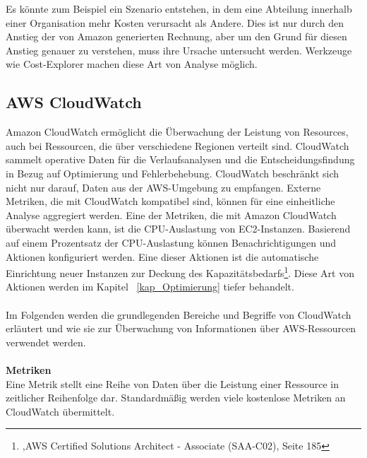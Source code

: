 Es könnte zum Beispiel ein Szenario entstehen, in dem eine Abteilung innerhalb einer Organisation mehr Kosten verursacht als Andere. Dies ist nur durch den Anstieg der von Amazon generierten Rechnung, aber um den Grund für diesen Anstieg genauer zu verstehen, muss ihre Ursache untersucht werden. Werkzeuge wie Cost-Explorer machen diese Art von Analyse möglich.


\subsection{AWS CloudWatch}
Amazon CloudWatch ermöglicht die Überwachung der Leistung von Resources, auch bei Ressourcen, die über verschiedene Regionen verteilt sind. CloudWatch sammelt operative Daten für die Verlaufsanalysen und die Entscheidungsfindung in Bezug auf Optimierung und Fehlerbehebung. CloudWatch beschränkt sich nicht nur darauf, Daten aus der AWS-Umgebung zu empfangen. Externe Metriken, die mit CloudWatch kompatibel sind, können für eine einheitliche Analyse aggregiert werden. Eine der Metriken, die mit Amazon CloudWatch überwacht werden kann, ist die CPU-Auslastung von EC2-Instanzen. Basierend auf einem Prozentsatz der CPU-Auslastung können Benachrichtigungen und Aktionen konfiguriert werden. Eine dieser Aktionen ist die automatische Einrichtung neuer Instanzen zur Deckung des Kapazitätsbedarfs\footnote{\cite{AWS1},AWS Certified Solutions Architect - Associate (SAA-C02), Seite 185}. Diese Art von Aktionen werden im Kapitel ~\ref{kap_Optimierung} tiefer behandelt.
\\\\
Im Folgenden werden die grundlegenden Bereiche und Begriffe von CloudWatch erläutert und wie sie zur Überwachung von Informationen über AWS-Ressourcen verwendet werden.
\\\\
\textbf{Metriken} \\
Eine Metrik stellt eine Reihe von Daten über die Leistung einer Ressource in zeitlicher Reihenfolge dar. Standardmäßig werden viele kostenlose Metriken an CloudWatch übermittelt.
